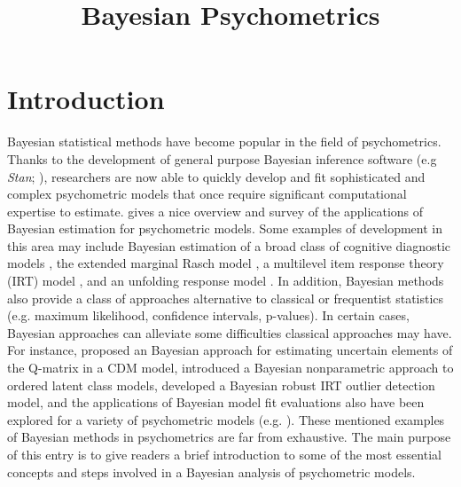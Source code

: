 \documentclass[floatsintext, man]{apa7}
\title{Bayesian Psychometrics}
\begin{document}
\maketitle
\section{Introduction}
Bayesian statistical methods have become popular in the field of psychometrics.
Thanks to the development of general purpose Bayesian inference software (e.g
\emph{Stan}; \cite{gelman_stan:_2015}), researchers are now able to quickly develop and
fit sophisticated and complex psychometric models that once require significant
computational expertise to estimate. \textcite{levy_rise_2009} gives a nice overview
and survey of the applications of Bayesian estimation for psychometric models.
Some examples of development in this area may include Bayesian estimation of a
broad class of cognitive diagnostic models 
\parencite{liu_estimating_2019,culpepper_bayesian_2015}, the
extended marginal Rasch model \parencite{maris_gibbs_2015}, a multilevel item
response theory (IRT) model \parencite{fox_bayesian_2001}, and an unfolding
response model \parencite{johnson_using_2003}. In addition, Bayesian
methods also provide a class of approaches alternative to classical or
frequentist statistics (e.g. maximum likelihood, confidence intervals,
p-values). In certain cases, Bayesian approaches can alleviate some difficulties
classical approaches may have. For instance, 
\textcite{decarlo_recognizing_2012} proposed an
Bayesian approach for estimating uncertain elements of the Q-matrix in a CDM
model, \textcite{liu_three_2019} introduced a Bayesian nonparametric approach to
ordered latent class models, \textcite{ozturk_bayesian_2017} developed a
Bayesian robust IRT outlier detection model, and the applications of Bayesian
model fit evaluations also have been explored for a variety of
psychometric models (e.g. 
\cite{sinharay_assessing_2007,sinharay_assessing_2005,sinharay_assessment_2015}). These
mentioned examples of Bayesian methods in psychometrics are far from exhaustive.
The main purpose of this entry is to give readers a brief introduction to some
of the most essential concepts and steps involved in a Bayesian analysis of
psychometric models.
\end{document}
